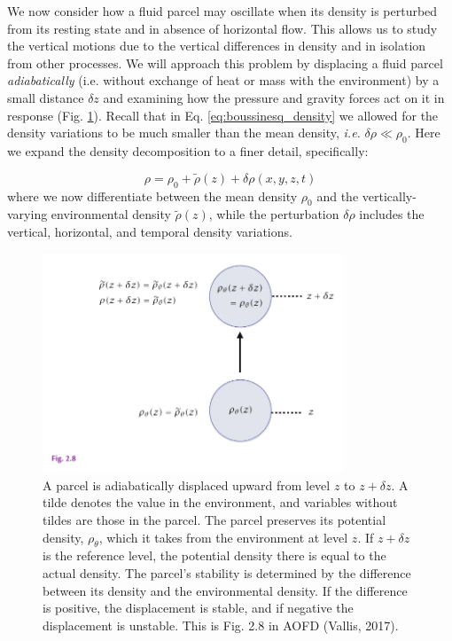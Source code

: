 \documentclass[12pt]{article}
\numberwithin{equation}{section}
\numberwithin{figure}{section}
\numberwithin{table}{section}
\begin{document}
We now consider how a fluid parcel may oscillate when its density is perturbed
from its resting state and in absence of horizontal flow.
This allows us to study the vertical motions due to the vertical differences
in density and in isolation from other processes.
We will approach this problem by displacing a fluid parcel
\textit{adiabatically}
(i.e. without exchange of heat or mass with the environment) by a small distance
$\delta z$ and examining how the pressure and gravity forces act on it in response
(Fig. \ref{fig:static_instability}).
Recall that in Eq. \ref{eq:boussinesq_density} we allowed for the density
variations to be much smaller than the mean density, \textit{i.e.}
$\delta \rho \ll \rho_0$.
Here we expand the density decomposition to a finer detail, specifically:

\begin{equation}
  \rho = \rho_0 + \widetilde{\rho}(z) + \delta \rho(x, y, z, t)
\end{equation}
where we now differentiate between the mean density $\rho_0$ and the
vertically-varying environmental density $\widetilde{\rho}(z)$, while the 
perturbation $\delta \rho$ includes the vertical, horizontal, and temporal
density variations.

\begin{figure}[h]
  \centering
  \includegraphics[width=0.8\textwidth]{assets/fig_static_instability.pdf}
  \caption{
    A parcel is adiabatically displaced upward from level $z$ to $z + \delta z$.
    A tilde denotes the value in the environment, and variables without tildes
    are those in the parcel.
    The parcel preserves its potential density, $\rho_\theta$, which it takes
    from the environment at level $z$.
    If $z + \delta z$ is the reference level, the potential density there is
    equal to the actual density.
    The parcel's stability is determined by the difference between its density
    and the environmental density.
    If the difference is positive, the displacement is stable, and if negative
    the displacement is unstable.
    This is Fig. 2.8 in AOFD (Vallis, 2017).
  }
  \label{fig:static_instability}
\end{figure}
\end{document}
